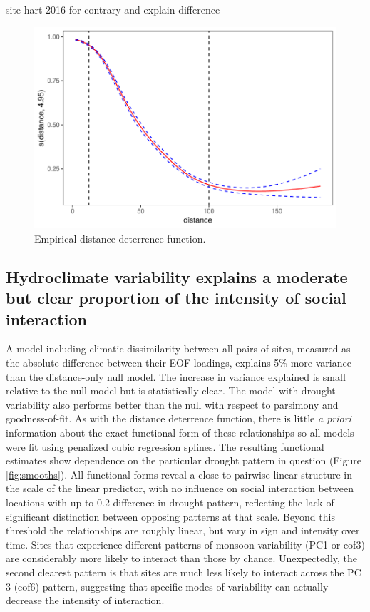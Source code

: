 \documentclass[11pt]{wlscirep}
\begin{document}
site hart 2016 for contrary and explain difference

\begin{figure}[!htbp]
\centering
\includegraphics[width=.5\linewidth]{figures/distance_function.pdf}
\caption{Empirical distance deterrence function.}
\label{fig:distance}
\end{figure}

\subsection*{Hydroclimate variability explains a moderate but clear proportion of the intensity of social interaction}
A model including climatic dissimilarity between all pairs of sites, measured as the absolute difference between their EOF loadings, explains 5\% more variance than the distance-only null model. The increase in variance explained is small relative to the null model but is statistically clear. The model with drought variability also performs better than the null with respect to parsimony and goodness-of-fit. As with the distance deterrence function, there is little \textit{a priori} information about the exact functional form of these relationships so all models were fit using penalized cubic regression splines. The resulting functional estimates show dependence on the particular drought pattern in question (Figure \ref{fig:smooths}). All functional forms reveal a close to pairwise linear structure in the scale of the linear predictor, with no influence on social interaction between locations with up to 0.2 difference in drought pattern, reflecting the lack of significant distinction between opposing patterns at that scale. Beyond this threshold the relationships are roughly linear, but vary in sign and intensity over time. Sites that experience different patterns of monsoon variability (PC1 or eof3) are considerably more likely to interact than those by chance. Unexpectedly, the second clearest pattern is that sites are much less likely to interact across the PC 3 (eof6) pattern, suggesting that specific modes of variability can actually decrease the intensity of interaction.
\end{document}
